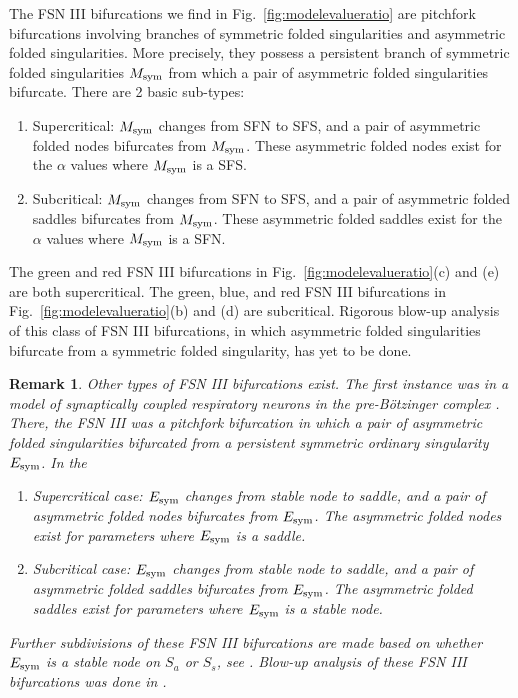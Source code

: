 \documentclass[10pt,onecolumn]{article}
\theoremstyle{plain}
\newtheorem{remark}{Remark}[section]
\begin{document}
The FSN III bifurcations we find in Fig.~\ref{fig:modelevalueratio} are pitchfork bifurcations involving branches of symmetric folded singularities and asymmetric folded singularities. 
More precisely, they possess a persistent branch of symmetric folded singularities $M_{\rm sym}$ from which a pair of asymmetric folded singularities bifurcate. %
There are 2 basic sub-types:
\begin{enumerate}[label=(\roman*)]
\item Supercritical: $M_{\rm sym}$ changes from SFN to SFS, and a pair of asymmetric folded nodes bifurcates from $M_{\rm sym}$. These asymmetric folded nodes exist for the $\alpha$ values where $M_{\rm sym}$ is a SFS.
\item Subcritical: $M_{\rm sym}$ changes from SFN to SFS, and a pair of asymmetric folded saddles bifurcates from $M_{\rm sym}$. These asymmetric folded saddles exist for the $\alpha$ values where $M_{\rm sym}$ is a SFN. 
\end{enumerate} 
The green and red FSN III bifurcations in Fig.~\ref{fig:modelevalueratio}(c) and (e) are both supercritical. 
The green, blue, and red FSN III bifurcations in Fig.~\ref{fig:modelevalueratio}(b) and (d) are subcritical. 
Rigorous blow-up analysis of this class of FSN III bifurcations, in which asymmetric folded singularities bifurcate from a symmetric folded singularity, has yet to be done.

\medskip
\begin{remark}
Other types of FSN III bifurcations exist. The first instance was in a model of synaptically coupled respiratory neurons in the pre-B\"otzinger complex \cite{Best2005,Roberts2015}. There, the FSN III was a pitchfork bifurcation in which a pair of asymmetric folded singularities bifurcated from a persistent symmetric ordinary singularity $E_{\rm sym}$. In the 
\begin{enumerate}[label=(\roman*)]
\item Supercritical case: $E_{\rm sym}$ changes from stable node to saddle, and a pair of asymmetric folded nodes bifurcates from $E_{\rm sym}$. The asymmetric folded nodes exist for parameters where $E_{\rm sym}$ is a saddle. 
\item Subcritical case: $E_{\rm sym}$ changes from stable node to saddle, and a pair of asymmetric folded saddles bifurcates from $E_{\rm sym}$. The asymmetric folded saddles exist for parameters where $E_{\rm sym}$ is a stable node. 
\end{enumerate}
Further subdivisions of these FSN III bifurcations are made based on whether $E_{\rm sym}$ is a stable node on $S_a$ or $S_s$, see \cite{Roberts2015,RobertsThesis}. 
Blow-up analysis of these FSN III bifurcations was done in \cite{RobertsThesis}. 
\end{remark}
\end{document}
